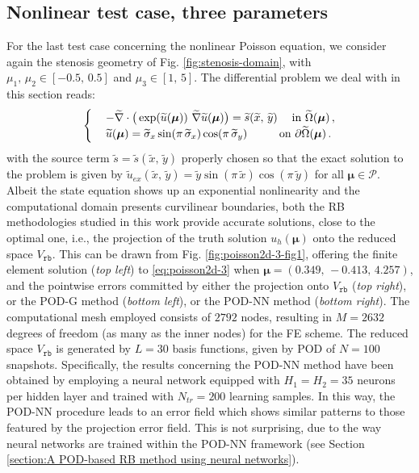 \documentclass[12pt, a4paper, twoside, openright, notitlepage]{report}
\numberwithin{equation}{chapter}
\theoremstyle{theorem}
\theoremstyle{definition}
\theoremstyle{remark}
\theoremstyle{proposition}
\numberwithin{figure}{chapter}
\newcommand{\wt}[1]{\widetilde{#1}}
\newcommand{\bg}[1]{\boldsymbol{#1}}
\begin{document}
	\subsection{Nonlinear test case, three parameters}
	\label{section:poisson2d-3}
	
		For the last test case concerning the nonlinear Poisson equation, we consider again the stenosis geometry of Fig. \ref{fig:stenosis-domain}, with $\mu_1, \, \mu_2 \in [-0.5, \, 0.5]$ and $\mu_3 \in [1, \, 5]$. The differential problem we deal with in this section reads:
		\begin{equation}
			\label{eq:poisson2d-3}
			\begin{cases}
				& - \wt{\nabla} \cdot \big( \exp(\wt{u}(\bg{\mu})) ~ \wt{\nabla} \wt{u}(\bg{\mu}) \big) = \wt{s}(\wt{x}, \, \wt{y}) \hspace*{0.45cm} \text{in $\wt{\Omega}(\bg{\mu})$} \, , \\
				& \wt{u}(\bg{\mu}) = \wt{\sigma}_x \sin(\pi \, \wt{\sigma}_x) \cos(\pi \, \wt{\sigma}_y) \hspace*{1.0cm} \text{on $\partial \wt{\Omega}(\bg{\mu})$} \, .
			\end{cases}
		\end{equation}
		with the source term $\wt{s} = \wt{s}(\wt{x}, \, \wt{y})$ properly chosen so that the exact solution to the problem is given by $\wt{u}_{ex}(\wt{x}, \, \wt{y}) = \wt{y} \sin(\pi \, \wt{x}) \cos(\pi \, \wt{y})$ for all $\bg{\mu} \in \mathcal{P}$. Albeit the state equation shows up an exponential nonlinearity and the computational domain presents curvilinear boundaries, both the RB methodologies studied in this work provide accurate solutions, close to the optimal one, i.e., the projection of the truth solution $u_h(\bg{\mu})$ onto the reduced space $V_{\texttt{rb}}$. This can be drawn from Fig. \ref{fig:poisson2d-3-fig1}, offering the finite element solution (\emph{top left}) to \eqref{eq:poisson2d-3} when $\bg{\mu} = (0.349, \, -0.413, \, 4.257)$, and the pointwise errors committed by either the projection onto $V_{\texttt{rb}}$ (\emph{top right}), or the POD-G method (\emph{bottom left}), or the POD-NN method (\emph{bottom right}). The computational mesh employed consists of $2792$ nodes, resulting in $M = 2632$ degrees of freedom (as many as the inner nodes) for the FE scheme. The reduced space $V_{\texttt{rb}}$ is generated by $L = 30$ basis functions, given by POD of $N = 100$ snapshots. Specifically, the results concerning the POD-NN method have been obtained by employing a neural network equipped with $H_1 = H_2 = 35$ neurons per hidden layer and trained with $N_{tr} = 200$ learning samples. In this way, the POD-NN procedure leads to an error field which shows similar patterns to those featured by the projection error field. This is not surprising, due to the way neural networks are trained within the POD-NN framework (see Section \ref{section:A POD-based RB method using neural networks}). 
				
\end{document}
